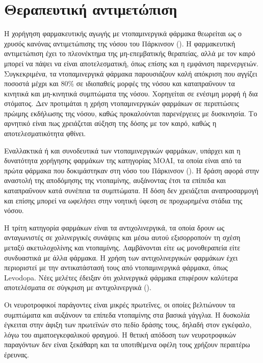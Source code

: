 \documentclass[12pt]{report}
\begin{document}
        \section{Θεραπευτική αντιμετώπιση}
        Η χορήγηση φαρμακευτικής αγωγής με ντοπαμινεργικά φάρμακα θεωρείται ως ο χρυσός κανόνας αντιμετώπισης της νόσου του Πάρκινσον (\emph{\cite{Lee2021ATreatment}}). Η φαρμακευτική αντιμετώπιση έχει το πλεονέκτημα της μη-επεμβατικής θεραπείας, αλλά με τον καιρό μπορεί να πάψει να είναι αποτελεσματική, όπως επίσης και η εμφάνιση παρενεργειών. Συγκεκριμένα, τα ντοπαμινεργικά φάρμακα παρουσιάζουν καλή απόκριση που αγγίζει ποσοστά μέχρι και 80\% σε ιδιοπαθείς μορφές της νόσου και καταπραΰνουν τα κινητικά και μη-κινητικά συμπτώματα της νόσου. Χορηγείται σε ενέσιμη μορφή ή δια στόματος. Δεν προτιμάται η χρήση ντοπαμινεργικών φαρμάκων σε περιπτώσεις πρώιμης εκδήλωσης της νόσου, καθώς προκαλούνται παρενέργειες με δυσκινησία. Το αρνητικό είναι πως χρειάζεται αύξηση της δόσης με τον καιρό, καθώς η αποτελεσματικότητα φθίνει. 
        \par
        Εναλλακτικά ή και συνοδευτικά των ντοπαμινεργικών φαρμάκων, υπάρχει και η δυνατότητα χορήγησης φαρμάκων της κατηγορίας MOAI, τα οποία είναι από τα πρώτα φάρμακα που δοκιμάστηκαν στη νόσο του Πάρκινσον (\emph{\cite{Riederer2011MAO-inhibitorsDisease}}). Η δράση αφορά στην αναστολή της αποδόμησης της ντοπαμίνης, αυξάνοντας έτσι τα επίπεδα και καταπραΰνουν κατά συνέπεια τα συμπτώματα. Η δόση δεν χρειάζεται αναπροσαρμογή και επίσης μπορεί να ωφελήσει στην νοητική ύφεση σε προχωρημένα στάδια της νόσου. 
        \par
        Η τρίτη κατηγορία φαρμάκων είναι τα αντιχολινεργικά, τα οποία δρουν ως ανταγωνιστές σε χολινεργικές συνάψεις και μέσω αυτού εξισορροπούν τη σχέση μεταξύ ακετυλοχολίνης και ντοπαμίνης. Λαμβάνονται είτε ως μονοθεραπεία είτε συνδυαστικά με άλλα φάρμακα. Η χρήση των αντιχολινεργικών φαρμάκων έχει περιοριστεί με την αντικατάστασή τους από ντοπαμινεργικά φάρμακα, όπως Levodopa. Νέες μελέτες έδειξαν ότι χολινεργικά φάρμακα επιφέρουν καλύτερα αποτελέσματα σε σύγκριση με αντιχολινεργικά (\emph{\cite{Lee2021ATreatment}}).
        \par
        Οι νευροτροφικοί παράγοντες είναι μικρές πρωτεΐνες, οι οποίες βελτιώνουν τα συμπτώματα και αυξάνουν τα επίπεδα ντοπαμίνης στα βασικά γάγγλια. Η δυσκολία έγκειται στην άφιξη των πρωτεϊνών στο πεδίο δράσης τους, δηλαδή στον εγκέφαλο, λόγω του αιματοεγκεφαλικού φραγμού. Η θετική απόδοση των νευροτροφικών παραγόντων δεν είναι ξεκάθαρη και τα υποτιθέμενα οφέλη τους χρήζουν περαιτέρω έρευνας.
\end{document}
